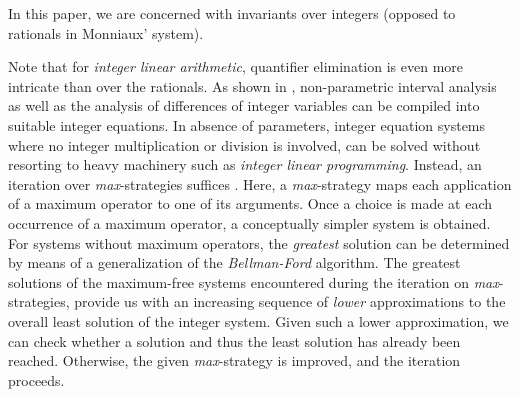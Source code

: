\documentclass[a4paper]{easychair}
\renewcommand{\qed}{\hfill\mbox{\rule[0pt]{1.3ex}{1.3ex}}}
\newcommand{\us}{\cite{Gawlitza07PreciseFix,DBLP:conf/fm/GawlitzaS08,EasyChair:235}\xspace}
\begin{document}
In this paper, we are concerned with invariants over integers (opposed to rationals in Monniaux'
system).

\noindent
Note that for \emph{integer linear arithmetic}, quantifier elimination
is even more intricate than over the rationals.
As shown in \cite{Gawlitza07PreciseFix,DBLP:conf/fm/GawlitzaS08,EasyChair:235}, non-parametric
interval analysis as well as the analysis of differences of integer variables can be compiled into 
suitable integer equations. 
In absence of parameters, integer equation systems where no integer multiplication or division is involved,
can be solved without resorting to heavy machinery such as \emph{integer linear programming}. 
Instead, an iteration over \emph{max}-strategies suffices \us. Here, a \emph{max}-strategy maps each application of a maximum operator to one of its arguments.
Once a choice is made at each occurrence of a maximum operator, a conceptually simpler system is obtained.
For systems without  maximum operators, the \emph{greatest} solution can be determined by means of 
a generalization of the \emph{Bellman-Ford} algorithm. 
The greatest solutions of the maximum-free systems
encountered during the iteration on \emph{max}-strategies, provide us with
an increasing sequence of \emph{lower} approximations to the overall least solution of the integer system.
Given such a lower approximation, we can check whether a solution and thus the least solution
has already been reached. Otherwise, the given \emph{max}-strategy is improved, and the iteration proceeds.
\end{document}
